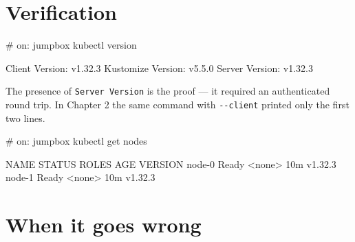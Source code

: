 \documentclass[11pt,oneside]{report}
\begin{document}
\hypertarget{verification-9}{%
\section{Verification}\label{verification-9}}

\begin{cmdlst}
# on: jumpbox
kubectl version
\end{cmdlst}

\begin{outlst}
Client Version: v1.32.3
Kustomize Version: v5.5.0
Server Version: v1.32.3
\end{outlst}

The presence of
\texttt{Server\ Version}
is the proof --- it
required an
authenticated round
trip. In Chapter 2
the same command
with
\texttt{-\/-client}
printed only the
first two lines.

\begin{cmdlst}
# on: jumpbox
kubectl get nodes
\end{cmdlst}

\begin{outlst}
NAME     STATUS   ROLES    AGE    VERSION
node-0   Ready    <none>   10m   v1.32.3
node-1   Ready    <none>   10m   v1.32.3
\end{outlst}

\hypertarget{when-it-goes-wrong-9}{%
\section{When it
goes
wrong}\label{when-it-goes-wrong-9}}
\end{document}
